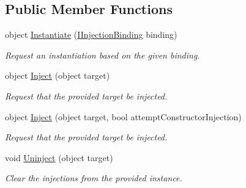 \subsection*{Public Member Functions}
\begin{DoxyCompactItemize}
\item 
object \hyperlink{classstrange_1_1extensions_1_1injector_1_1impl_1_1_injector_af2e993fb61630c887d378d36b19bac6f}{Instantiate} (\hyperlink{interfacestrange_1_1extensions_1_1injector_1_1api_1_1_i_injection_binding}{I\-Injection\-Binding} binding)
\begin{DoxyCompactList}\small\item\em Request an instantiation based on the given binding. \end{DoxyCompactList}\item 
\hypertarget{classstrange_1_1extensions_1_1injector_1_1impl_1_1_injector_a8e68bee15edd6eae305e1e2a4f24ff6c}{object \hyperlink{classstrange_1_1extensions_1_1injector_1_1impl_1_1_injector_a8e68bee15edd6eae305e1e2a4f24ff6c}{Inject} (object target)}\label{classstrange_1_1extensions_1_1injector_1_1impl_1_1_injector_a8e68bee15edd6eae305e1e2a4f24ff6c}

\begin{DoxyCompactList}\small\item\em Request that the provided target be injected. \end{DoxyCompactList}\item 
\hypertarget{classstrange_1_1extensions_1_1injector_1_1impl_1_1_injector_ae6df3d7fb5fc7d18a2ca9c2c8e754783}{object \hyperlink{classstrange_1_1extensions_1_1injector_1_1impl_1_1_injector_ae6df3d7fb5fc7d18a2ca9c2c8e754783}{Inject} (object target, bool attempt\-Constructor\-Injection)}\label{classstrange_1_1extensions_1_1injector_1_1impl_1_1_injector_ae6df3d7fb5fc7d18a2ca9c2c8e754783}

\begin{DoxyCompactList}\small\item\em Request that the provided target be injected. \end{DoxyCompactList}\item 
void \hyperlink{classstrange_1_1extensions_1_1injector_1_1impl_1_1_injector_aadbd3054a566efbcef0fb1cdc3dc3e23}{Uninject} (object target)
\begin{DoxyCompactList}\small\item\em Clear the injections from the provided instance. \end{DoxyCompactList}\end{DoxyCompactItemize}
